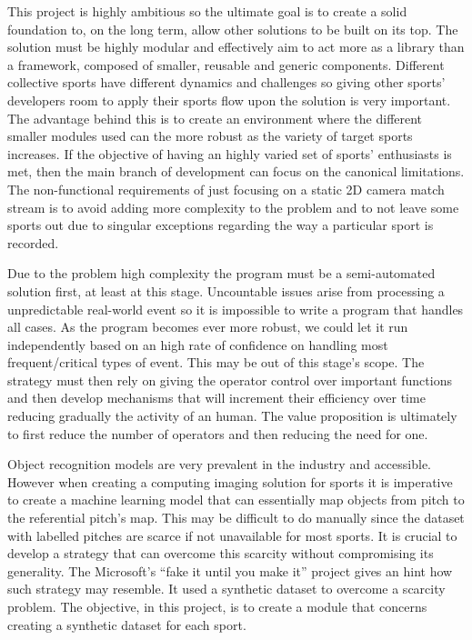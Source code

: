 \documentclass[
    11pt,
    twoside
]{report}
\begin{document}
This project is highly ambitious so the ultimate goal is to create a solid foundation to, on the long term, allow other solutions to be built on its top. The solution must be highly modular and effectively aim to act more as a library than a framework, composed of smaller, reusable and generic components. Different collective sports have different dynamics and challenges so giving other sports' developers room to apply their sports flow upon the solution is very important. The advantage behind this is to create an environment where the different smaller modules used can the more robust as the variety of target sports increases. If the objective of having an highly varied set of sports' enthusiasts is met, then the main branch of development can focus on the canonical limitations. The non-functional requirements of just focusing on a static 2D camera match stream is to avoid adding more complexity to the problem and to not leave some sports out due to singular exceptions regarding the way a particular sport is recorded.


Due to the problem high complexity the program must be a semi-automated solution first, at least at this stage. Uncountable issues arise from processing a unpredictable real-world event so it is impossible to write a program that handles all cases. As the program becomes ever more robust, we could let it run independently based on an high rate of confidence on handling most frequent/critical types of event. This may be out of this stage's scope. The strategy must then rely on giving the operator control over important functions and then develop mechanisms that will increment their efficiency over time reducing gradually the activity of an human. The value proposition is ultimately to first reduce the number of operators and then reducing the need for one.


Object recognition models are very prevalent in the industry and accessible. However when creating a computing imaging solution for sports it is imperative to create a machine learning model that can essentially map objects from pitch to the referential pitch's map. This may be difficult to do manually since the dataset with labelled pitches are scarce if not unavailable for most sports. It is crucial to develop a strategy that can overcome this scarcity without compromising its generality. The Microsoft's ``fake it until you make it'' project \cite{ms_fake} gives an hint how such strategy may resemble. It used a synthetic dataset to overcome a scarcity problem. The objective, in this project, is to create a module that concerns creating a synthetic dataset for each sport.
\end{document}
